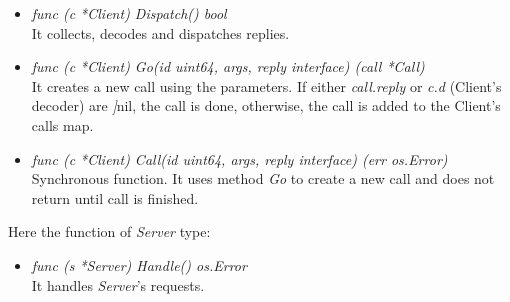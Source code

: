 \begin{itemize}

\item \emph{func (c *Client) Dispatch() bool}\\
It collects, decodes and dispatches replies.

\item \emph{func (c *Client) Go(id uint64, args, reply interface{}) (call *Call)}\\
It creates a new call using the parameters. If either \emph{call.reply} or \emph{c.d} (Client's decoder) are \emph]{nil}, the call is done, otherwise, the call is added to the Client's calls map.

\item \emph{func (c *Client) Call(id uint64, args, reply interface{}) (err os.Error)}\\
Synchronous function. It uses method \emph{Go} to create a new call and does not return until call is finished. 

\end{itemize}
Here the function of \emph{Server} type:

\begin{itemize}

\item \emph{func (s *Server) Handle() os.Error}\\
It handles \emph{Server}'s requests.

\end{itemize}